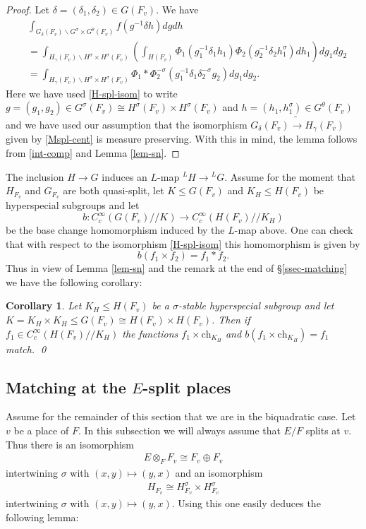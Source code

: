 \documentclass[12pt]{amsart}
\newtheorem{cor}[thm]{Corollary}
\theoremstyle{remark}
\numberwithin{equation}{section}
\newcommand{\lto}{\longrightarrow}
\theoremstyle{definition}
\numberwithin{equation}{subsection}
\begin{document}
\begin{proof} Let $\delta=(\delta_1,\delta_2) \in G(F_v)$. We have
\begin{align}
\nonumber &\int_{G_{\delta}(F_v) \backslash G^{\sigma} \times G^{\theta}(F_v)} f(g^{-1} \delta h) dgdh\\
\label{int-comp}&=\int_{H_{\gamma}(F_v) \backslash H^{\sigma} \times H^{\sigma}(F_v)} \left( \int_{H(F_v)} \Phi_1(g_1^{-1}\delta_1 h_1)\Phi_2(g_2^{-1}\delta_2h_1^{\sigma})dh_1\right)dg_1dg_2\\
\nonumber&=\int_{H_{\gamma}(F_v) \backslash H^{\sigma} \times H^{\sigma}(F_v)} \Phi_1*\Phi_2^{-\sigma}(g_1^{-1}\delta_1 \delta_2^{-\sigma}g_2)dg_1dg_2.
\end{align}
Here we have used \eqref{H-spl-isom} to write
$g=(g_1,g_2) \in G^{\sigma}(F_v) \cong H^{\sigma}(F_v) \times H^{\sigma}(F_v)$ and
$h=(h_1,h_1^{\sigma}) \in G^{\theta}(F_v)$ and we have used our assumption that the isomorphism
$G_{\delta}(F_v) \tilde{\lto} H_{\gamma}(F_v)$ given by \eqref{Mspl-cent} is measure preserving.  With
this in mind,
the lemma follows from \eqref{int-comp} and Lemma \ref{lem-sn}.
\end{proof}

The inclusion $H \to G$ induces an $L$-map ${}^LH \to {}^LG$.
Assume for the moment that $H_{F_v}$ and $G_{F_v}$ are both quasi-split, let $K \leq G(F_v)$ and $K_H \leq H(F_v)$ be hyperspecial subgroups and let
$$
b:C_c^{\infty}(G(F_v)//K) \lto C_c^{\infty}(H(F_{v})//K_H)
$$be the base change homomorphism induced by the $L$-map above.  One can check that with respect to the isomorphism \eqref{H-spl-isom} this homomorphism is given by
$$
b(f_1 \times f_2) =f_1*f_2.
$$
Thus in view of Lemma \ref{lem-sn} and the remark at the end of \S \ref{ssec-matching} we have the following corollary:

\begin{cor} \label{cor-H-split-matching} Let $K_H \leq H(F_v)$ be a $\sigma$-stable
hyperspecial subgroup and let $K=K_H \times K_H \leq G(F_v) \cong H(F_v) \times H(F_v)$.  Then if $f_1 \in C_c^{\infty}(H(F_v)//K_H)$ the functions $f_1 \times \mathrm{ch}_{K_H}$ and $b(f_1 \times \mathrm{ch}_{K_H})=f_1$  match. \qed
\end{cor}



\subsection{Matching at the $E$-split places} \label{ssec-split-match}
Assume for the remainder of this section that we are in the biquadratic case.
Let $v$ be a place of $F$.  In this subsection we will always assume that $E/F$ splits at $v$.
Thus there is an isomorphism
\begin{align} \label{e-spl-isom}
E \otimes_F F_v \cong F_v \oplus F_v
\end{align}
 intertwining $\sigma$ with $(x,y) \mapsto (y,x)$ and an isomorphism
\begin{align} \label{e-spl-isom2}
H_{F_v} \cong H^{\sigma}_{F_v} \times H^{\sigma}_{F_v}
\end{align}
intertwining $\sigma$ with $(x,y) \mapsto (y,x)$.
Using this one easily deduces the following lemma:
\end{document}

